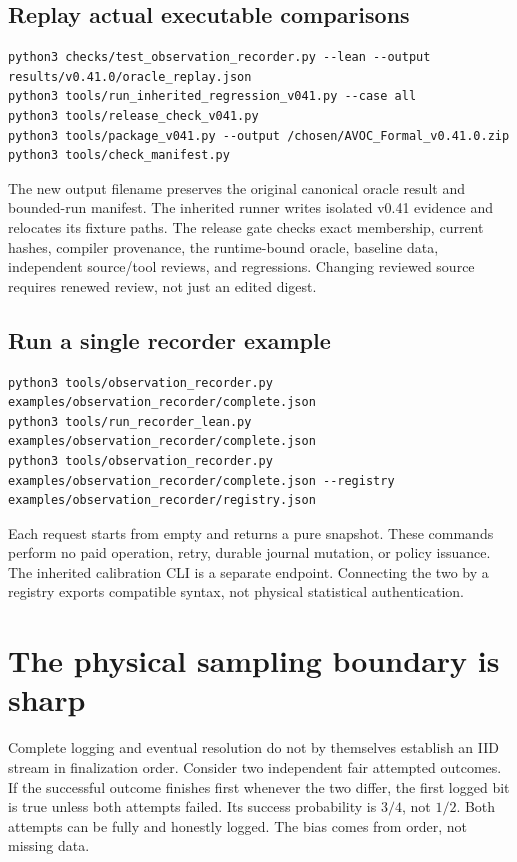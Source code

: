 \documentclass[11pt]{article}
\begin{document}
\subsection{Replay actual executable comparisons}
\begin{lstlisting}[style=LeanCode]
python3 checks/test_observation_recorder.py --lean --output results/v0.41.0/oracle_replay.json
python3 tools/run_inherited_regression_v041.py --case all
python3 tools/release_check_v041.py
python3 tools/package_v041.py --output /chosen/AVOC_Formal_v0.41.0.zip
python3 tools/check_manifest.py
\end{lstlisting}
The new output filename preserves the original canonical oracle result and
bounded-run manifest. The inherited runner writes isolated v0.41 evidence and
relocates its fixture paths. The release gate checks exact membership, current
hashes, compiler provenance, the runtime-bound oracle, baseline data,
independent source/tool reviews, and regressions. Changing reviewed source
requires renewed review, not just an edited digest.

\subsection{Run a single recorder example}
\begin{lstlisting}[style=LeanCode]
python3 tools/observation_recorder.py examples/observation_recorder/complete.json
python3 tools/run_recorder_lean.py examples/observation_recorder/complete.json
python3 tools/observation_recorder.py examples/observation_recorder/complete.json --registry examples/observation_recorder/registry.json
\end{lstlisting}
Each request starts from empty and returns a pure snapshot. These commands
perform no paid operation, retry, durable journal mutation, or policy issuance.
The inherited calibration CLI is a separate endpoint. Connecting the two by a
registry exports compatible syntax, not physical statistical authentication.

\section{The physical sampling boundary is sharp}
\label{sec:physical}
Complete logging and eventual resolution do not by themselves establish an
IID stream in finalization order. Consider two independent fair attempted
outcomes. If the successful outcome finishes first whenever the two differ,
the first logged bit is true unless both attempts failed. Its success
probability is $3/4$, not $1/2$. Both attempts can be fully and honestly logged.
The bias comes from order, not missing data.
\end{document}
